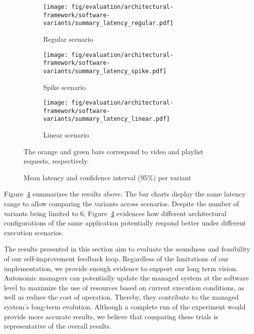 \begin{figure}[p]
	\centering
	\begin{subfigure}[b]{0.48\textwidth}
		\texttt{[image: fig/evaluation/architectural-framework/software-variants/summary\_latency\_regular.pdf]}
		\caption{Regular scenario}
		\label{fig:evaluation--im-architecture-regular-latency-summary}
	\end{subfigure}
	\begin{subfigure}[b]{0.48\textwidth}
		\texttt{[image: fig/evaluation/architectural-framework/software-variants/summary\_latency\_spike.pdf]}
		\caption{Spike scenario}
		\label{fig:evaluation--im-architecture-spike-latency-summary}
	\end{subfigure}
	\begin{subfigure}[b]{0.48\textwidth}
		\texttt{[image: fig/evaluation/architectural-framework/software-variants/summary\_latency\_linear.pdf]}
		\caption{Linear scenario}
		\label{fig:evaluation--im-architecture-linear-latency-summary}
	\end{subfigure}
	\caption{Mean latency and confidence interval (95\%) per variant}
	\label{fig:evaluation--im-architecture-latency-summary}
	The orange and green bars correspond to video and playlist requests, respectively.
\end{figure}

Figure~\ref{fig:evaluation--im-architecture-latency-summary} summarizes the results above. The bar charts display the same latency range to allow comparing the variants across scenarios. Despite the number of variants being limited to 6, Figure~\ref{fig:evaluation--im-architecture-latency-summary} evidences how different architectural configurations of the same application potentially respond better under different execution scenarios.

The results presented in this section aim to evaluate the soundness and feasibility of our self-improvement feedback loop. Regardless of the limitations of our implementation, we provide enough evidence to support our long term vision. Autonomic managers can potentially update the managed system at the software level to maximize the use of resources based on current execution conditions, as well as reduce the cost of operation. Thereby, they contribute to the managed system's long-term evolution. Although a complete run of the experiment would provide more accurate results, we believe that comparing these trials is representative of the overall results.




